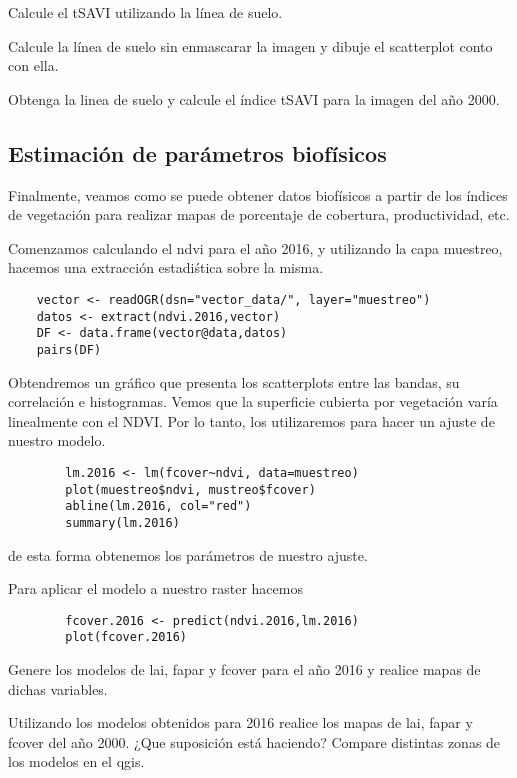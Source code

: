 \begin{act}
    Calcule el tSAVI utilizando la l\'inea de suelo.
\end{act}

\begin{act}
    Calcule la l\'inea de suelo sin enmascarar la imagen y dibuje el
    scatterplot conto con ella.
\end{act}

\begin{act}
    Obtenga la linea de suelo y calcule el \'indice tSAVI para la imagen del año
    2000.
\end{act}

\subsection{Estimaci\'on de par\'ametros biof\'isicos}

Finalmente, veamos como se puede obtener datos biof\'isicos a partir de los
\'indices de vegetaci\'on para realizar mapas de
porcentaje de cobertura, productividad, etc.

\begin{exa}
    Comenzamos calculando el ndvi para el año 2016, y utilizando la capa
    muestreo, hacemos una extracci\'on estadi\'stica sobre la misma.
    \begin{lstlisting}
    vector <- readOGR(dsn="vector_data/", layer="muestreo")
    datos <- extract(ndvi.2016,vector)
    DF <- data.frame(vector@data,datos)
    pairs(DF)
    \end{lstlisting}

    Obtendremos un gr\'afico que presenta los scatterplots entre las bandas, su
    correlaci\'on e histogramas.
    Vemos que la superficie cubierta por vegetaci\'on var\'ia
    linealmente con el NDVI\@. Por lo tanto, los utilizaremos para hacer un ajuste de nuestro modelo.
    \begin{lstlisting}
        lm.2016 <- lm(fcover~ndvi, data=muestreo)
        plot(muestreo$ndvi, mustreo$fcover)
        abline(lm.2016, col="red")
        summary(lm.2016)
    \end{lstlisting}
    de esta forma obtenemos los par\'ametros de nuestro ajuste.

    Para aplicar el modelo a nuestro raster hacemos
    \begin{lstlisting}
        fcover.2016 <- predict(ndvi.2016,lm.2016)
        plot(fcover.2016)
    \end{lstlisting}
\end{exa}

\begin{act}
    Genere los modelos de lai, fapar y fcover para el año 2016 y
    realice mapas de dichas variables.
\end{act}

\begin{act}
    Utilizando los modelos obtenidos para 2016 realice
    los mapas de lai, fapar y fcover del año 2000. ¿Que suposici\'on est\'a
    haciendo? Compare distintas zonas de los modelos en el qgis.
\end{act}
